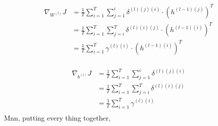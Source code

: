 \documentclass{article}
\begin{document}
	\begin{equation}
	\begin{aligned}
		\nabla_{W^{(l)}} J 
		&= \frac{1}{T} \sum_{i=1}^{T} \sum_{j=1}^{i} \delta^{(l)(j)(i)} \cdot  (h^{(l-1)(j)})^T\\
		&= \frac{1}{T} \sum_{i=1}^{T} \sum_{j=i}^{T} \delta^{(l)(i)(j)} \cdot  (h^{(l-1)(i)})^T\\
		&= \frac{1}{T} \sum_{i=1}^{T} \gamma^{(l)(i)} \cdot  (h^{(l-1)(i)})^T\\
	\end{aligned}
	\end{equation}
	
	\begin{equation}
	\begin{aligned}
		\nabla_{b^{(l)}} J 
		&= \frac{1}{T} \sum_{i=1}^{T} \sum_{j=1}^{i} \delta^{(l)(j)(i)} \\
		&= \frac{1}{T} \sum_{i=1}^{T} \sum_{j=i}^{T} \delta^{(l)(i)(j)} \\
		&= \frac{1}{T} \sum_{i=1}^{T} \gamma^{(l)(i)} \\
	\end{aligned}
	\end{equation}
	Mnn, putting every thing together,
\end{document}

